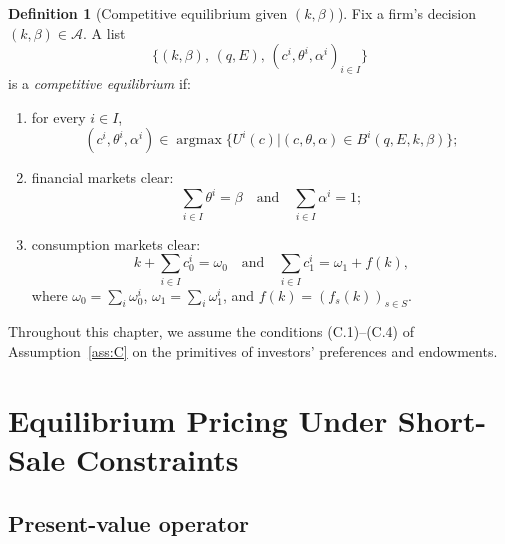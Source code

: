 \documentclass[11pt,a4paper,oneside]{book}
\def\et{\quad \text{and} \quad}
\DeclareMathOperator*{\argmax}{argmax}
\theoremstyle{plain}
\theoremstyle{definition}
\newtheorem{definition}[theorem]{Definition}
\theoremstyle{remark}
\numberwithin{equation}{chapter}
\begin{document}
\begin{definition}[Competitive equilibrium given $(k, \beta)$]\label{def:eq-BGR}
Fix a firm's decision $(k, \beta) \in \mathcal{A}$.
A list
\begin{equation*}
  \bigl\{ (k, \beta), \, (q, E), \, (c^i, \theta^i, \alpha^i)_{i \in I} \bigr\}
\end{equation*}
is a \emph{competitive equilibrium} if:
\begin{enumerate}
  \item[(a)] for every $i \in I$,
  \begin{equation*}
    (c^i, \theta^i, \alpha^i) \in \argmax \bigl\{ U^i(c) \vert (c, \theta, \alpha) \in B^i(q, E, k, \beta) \bigr\};
  \end{equation*}
  \item[(b)] financial markets clear:
  \begin{equation*}
    \sum_{i \in I} \theta^i = \beta
    \et
    \sum_{i \in I} \alpha^i = 1;
  \end{equation*}
  \item[(c)] consumption markets clear:
  \begin{equation*}
    k + \sum_{i \in I} c^i_0 = \omega_0
    \et
    \sum_{i \in I} c^i_1 = \omega_1 + f(k),
  \end{equation*}
  where $\omega_0 = \sum_i \omega^i_0$, $\omega_1 = \sum_i \omega^i_1$, and $f(k) = (f_s(k))_{s \in S}$.
\end{enumerate}
\end{definition}

Throughout this chapter, we assume the conditions (C.1)--(C.4) of Assumption~\ref{ass:C} on the primitives of investors' preferences and endowments.

\section{Equilibrium Pricing Under Short-Sale Constraints}
\label{sec:bgr-pricing}

\subsection{Present-value operator}
\end{document}
